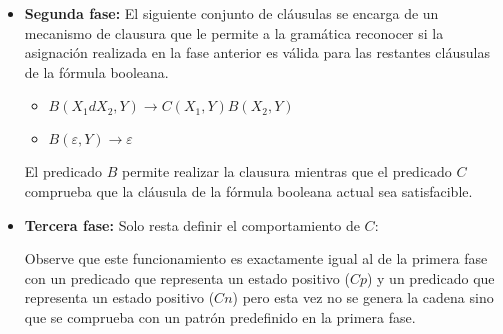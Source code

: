 \begin{itemize}
    \item \textbf{Segunda fase:} El siguiente conjunto de cláusulas se encarga de un mecanismo de clausura que le permite a la gramática
          reconocer si la asignación realizada en la fase anterior es válida para las restantes cláusulas de la fórmula
          booleana.
          \begin{itemize}
              \item $B(X_1dX_2,Y)\to C(X_1,Y) B(X_2,Y)$
              \item $B(\varepsilon,Y)\to\varepsilon$
          \end{itemize}

          El predicado $B$ permite realizar la clausura mientras que el predicado $C$ comprueba que la cláusula de la fórmula
          booleana actual sea satisfacible.

    \item \textbf{Tercera fase:} Solo resta definir el comportamiento de $C$:
          \begin{itemize}
          \end{itemize}

          Observe que este funcionamiento es exactamente igual al de la primera fase con un predicado que representa un estado
          positivo ($Cp$) y un predicado que representa un estado
          positivo ($Cn$) pero esta vez no se genera la cadena sino que se comprueba con un patrón predefinido en la primera
          fase.

\end{itemize}


